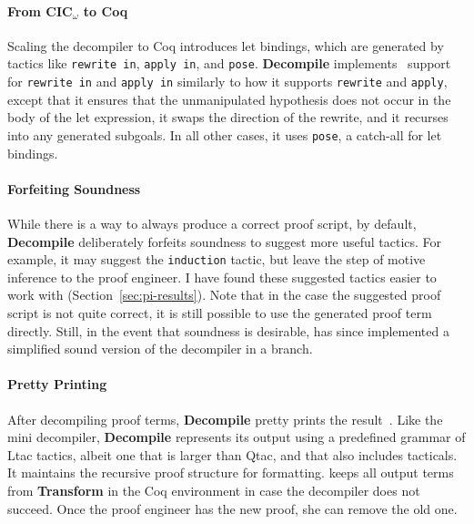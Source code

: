\paragraph{From CIC$_{\omega}$ to Coq}
Scaling the decompiler to Coq introduces let bindings, which are generated by 
tactics like \lstinline{rewrite in}, \lstinline{apply in}, and \lstinline{pose}.
\textbf{Decompile} implements~\href{https://github.com/uwplse/coq-plugin-lib/blob/9ef05815c261de9c99b604c6b581ba1c4fbc1a46/src/coq/decompiler/decompiler.ml}{} %
support for \lstinline{rewrite in} and \lstinline{apply in} similarly to how it supports
\lstinline{rewrite} and \lstinline{apply}, except that it ensures that the unmanipulated hypothesis does not occur in the body of the let expression,
it swaps the direction of the rewrite, and it recurses into any generated subgoals.
In all other cases, it uses \lstinline{pose}, a catch-all for let bindings.

\paragraph{Forfeiting Soundness}
While there is a way to always produce a correct proof script,
by default, \textbf{Decompile} deliberately forfeits soundness to suggest more useful tactics.
For example, it may suggest the \lstinline{induction} tactic, but leave the step of motive inference to the proof engineer.
I have found these suggested tactics easier to work with (Section~\ref{sec:pi-results}).
Note that in the case the suggested proof script is not quite correct,
it is still possible to use the generated proof term directly.
Still, in the event that soundness is desirable,  has since implemented a simplified sound
version of the decompiler in a branch. %

\paragraph{Pretty Printing}
After decompiling proof terms, \textbf{Decompile} pretty prints the result~\href{https://github.com/uwplse/coq-plugin-lib/blob/9ef05815c261de9c99b604c6b581ba1c4fbc1a46/src/coq/decompiler/decompiler.ml}{}.
Like the mini decompiler, \textbf{Decompile} represents its output using a predefined grammar of Ltac tactics,
albeit one that is larger than Qtac, and that also includes tacticals.
It maintains the recursive proof structure for formatting. %
\toolnamec keeps all output terms from \textbf{Transform} in the Coq environment in case the decompiler does not succeed.
Once the proof engineer has the new proof, she can remove the old one.


